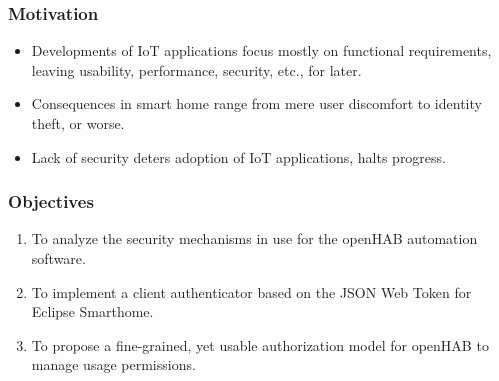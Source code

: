 \documentclass{beamer}
\begin{document}
\begin{frame}
\frametitle{Motivation}
\begin{itemize}
  \setlength\itemsep{1.5em}
\item Developments of IoT applications focus mostly on functional requirements, leaving usability, performance, security, etc., for later.
\item Consequences in smart home range from mere user discomfort to identity theft, or worse.
\item Lack of security deters adoption of IoT applications, halts progress. 
\end{itemize}
\end{frame}
\begin{frame}
\frametitle{Objectives} %
\begin{enumerate}
  \setlength\itemsep{1.5em}
\item To analyze the security mechanisms in use for the openHAB automation software.
\item To implement a client authenticator based on the JSON Web Token for Eclipse Smarthome.
\item To propose a fine-grained, yet usable authorization model for openHAB to manage usage permissions.
\end{enumerate}
\end{frame}
\end{document}
